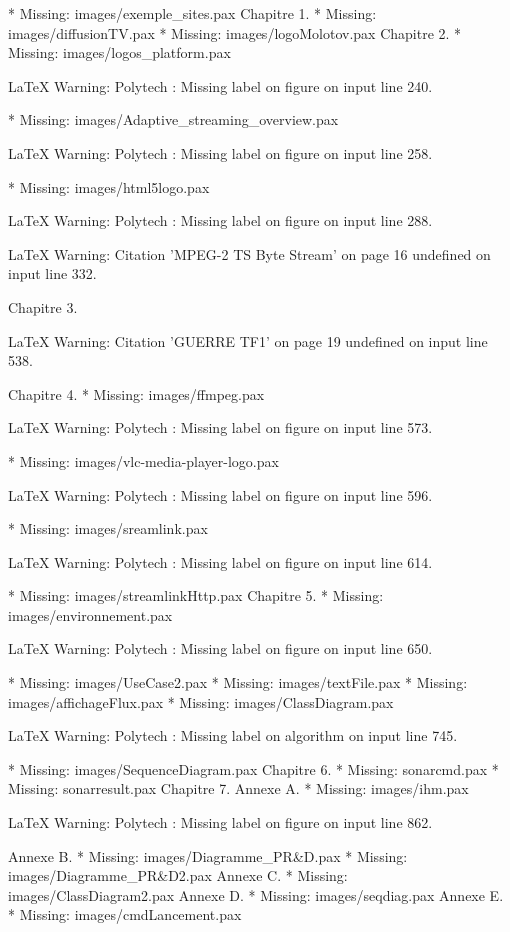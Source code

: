 * Missing: images/exemple_sites.pax
Chapitre 1.
* Missing: images/diffusionTV.pax
* Missing: images/logoMolotov.pax
Chapitre 2.
* Missing: images/logos_platform.pax

LaTeX Warning: Polytech : Missing label on figure on input line 240.

* Missing: images/Adaptive_streaming_overview.pax

LaTeX Warning: Polytech : Missing label on figure on input line 258.

* Missing: images/html5logo.pax

LaTeX Warning: Polytech : Missing label on figure on input line 288.


LaTeX Warning: Citation 'MPEG-2 TS Byte Stream' on page 16 undefined on input line 332.

Chapitre 3.

LaTeX Warning: Citation 'GUERRE TF1' on page 19 undefined on input line 538.

Chapitre 4.
* Missing: images/ffmpeg.pax

LaTeX Warning: Polytech : Missing label on figure on input line 573.

* Missing: images/vlc-media-player-logo.pax

LaTeX Warning: Polytech : Missing label on figure on input line 596.

* Missing: images/sreamlink.pax

LaTeX Warning: Polytech : Missing label on figure on input line 614.

* Missing: images/streamlinkHttp.pax
Chapitre 5.
* Missing: images/environnement.pax

LaTeX Warning: Polytech : Missing label on figure on input line 650.

* Missing: images/UseCase2.pax
* Missing: images/textFile.pax
* Missing: images/affichageFlux.pax
* Missing: images/ClassDiagram.pax

LaTeX Warning: Polytech : Missing label on algorithm on input line 745.

* Missing: images/SequenceDiagram.pax
Chapitre 6.
* Missing: sonarcmd.pax
* Missing: sonarresult.pax
Chapitre 7.
Annexe A.
* Missing: images/ihm.pax

LaTeX Warning: Polytech : Missing label on figure on input line 862.

Annexe B.
* Missing: images/Diagramme_PR&D.pax
* Missing: images/Diagramme_PR&D2.pax
Annexe C.
* Missing: images/ClassDiagram2.pax
Annexe D.
* Missing: images/seqdiag.pax
Annexe E.
* Missing: images/cmdLancement.pax

